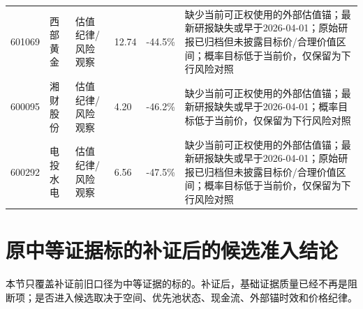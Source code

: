 \begin{longtable}{L{1.0cm}L{1.6cm}L{2.5cm}R{1.1cm}R{1.0cm}L{7.0cm}}
601069 & 西部黄金 & 估值纪律/风险观察 & 12.74 & -44.5\% & 缺少当前可正权使用的外部估值锚；最新研报缺失或早于2026-04-01；原始研报已归档但未披露目标价/合理价值区间；概率目标低于当前价，仅保留为下行风险对照 \\
600095 & 湘财股份 & 估值纪律/风险观察 & 4.20 & -46.2\% & 缺少当前可正权使用的外部估值锚；最新研报缺失或早于2026-04-01；概率目标低于当前价，仅保留为下行风险对照 \\
600292 & 电投水电 & 估值纪律/风险观察 & 6.56 & -47.5\% & 缺少当前可正权使用的外部估值锚；最新研报缺失或早于2026-04-01；原始研报已归档但未披露目标价/合理价值区间；概率目标低于当前价，仅保留为下行风险对照 \\
\bottomrule
\end{longtable}
\normalsize

\section{原中等证据标的补证后的候选准入结论}

本节只覆盖补证前旧口径为中等证据的标的。补证后，基础证据质量已经不再是阻断项；是否进入候选取决于空间、优先池状态、现金流、外部锚时效和价格纪律。


